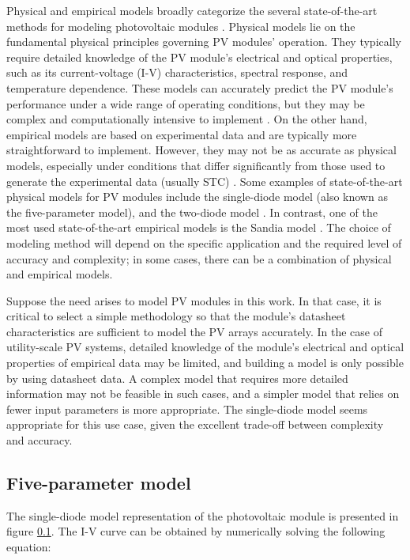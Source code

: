Physical and empirical models broadly categorize the several state-of-the-art methods for modeling photovoltaic modules \cite{Braun2011}. Physical models lie on the fundamental physical principles governing PV modules' operation. They typically require detailed knowledge of the PV module's electrical and optical properties, such as its current-voltage (I-V) characteristics, spectral response, and temperature dependence. These models can accurately predict the PV module's performance under a wide range of operating conditions, but they may be complex and computationally intensive to implement \cite{Kumar2019}. On the other hand, empirical models are based on experimental data and are typically more straightforward to implement. However, they may not be as accurate as physical models, especially under conditions that differ significantly from those used to generate the experimental data (usually STC) \cite{Braun2011}. Some examples of state-of-the-art physical models for PV modules include the single-diode model (also known as the five-parameter model), and the two-diode model \cite{Godina2017}. In contrast, one of the most used state-of-the-art empirical models is the Sandia model \cite{Braun2011}. The choice of modeling method will depend on the specific application and the required level of accuracy and complexity; in some cases, there can be a combination of physical and empirical models.

Suppose the need arises to model PV modules in this work. In that case, it is critical to select a simple methodology so that the module's datasheet characteristics are sufficient to model the PV arrays accurately. In the case of utility-scale PV systems, detailed knowledge of the module's electrical and optical properties of empirical data may be limited, and building a model is only possible by using datasheet data. A complex model that requires more detailed information may not be feasible in such cases, and a simpler model that relies on fewer input parameters is more appropriate. The single-diode model seems appropriate for this use case, given the excellent trade-off between complexity and accuracy.

\subsection{Five-parameter model}

The single-diode model representation of the photovoltaic module is presented in figure \ref{}. The I-V curve can be obtained by numerically solving the following equation:

